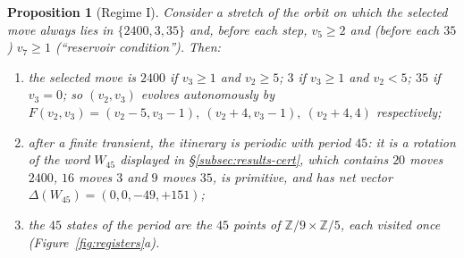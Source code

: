 \documentclass[11pt,a4paper]{article}
\newtheorem{proposition}[theorem]{Proposition}
\theoremstyle{definition}
\newcommand{\Wa}{W_{45}}
\begin{document}
\begin{proposition}[Regime I]\label{prop:reg1}
Consider a stretch of the orbit on which the selected move always lies in $\{2400,3,35\}$ and, before each step, $v_5\ge2$ and (before each $35$) $v_7\ge1$ (``reservoir condition''). Then:
\begin{enumerate}[label=(\roman*)]
\item the selected move is $2400$ if $v_3\ge1$ and $v_2\ge5$; $3$ if $v_3\ge1$ and $v_2<5$; $35$ if $v_3=0$; so $(v_2,v_3)$ evolves autonomously by
$F(v_2,v_3)=(v_2-5,v_3-1),\ (v_2+4,v_3-1),\ (v_2+4,4)$ respectively;
\item after a finite transient, the itinerary is periodic with period $45$: it is a rotation of the word $\Wa$ displayed in \S\ref{subsec:results-cert}, which contains $20$ moves $2400$, $16$ moves $3$ and $9$ moves $35$, is primitive, and has net vector $\Delta(\Wa)=(0,0,-49,+151)$;
\item the $45$ states of the period are the $45$ points of $\mathbb{Z}/9\times\mathbb{Z}/5$, each visited once (Figure~\ref{fig:registers}a).
\end{enumerate}
\end{proposition}
\end{document}
